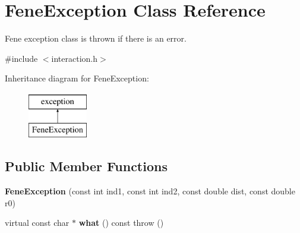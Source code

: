 \hypertarget{classFeneException}{\section{Fene\-Exception Class Reference}
\label{classFeneException}
}


Fene exception class is thrown if there is an error.  




{\ttfamily \#include $<$interaction.\-h$>$}

Inheritance diagram for Fene\-Exception\-:\begin{figure}[H]
\begin{center}
\leavevmode
\includegraphics[height=2.000000cm]{classFeneException}
\end{center}
\end{figure}
\subsection*{Public Member Functions}
\begin{DoxyCompactItemize}
\item 
\hypertarget{classFeneException_a0c49ab4b1d3554ac7520516fef599c70}{{\bfseries Fene\-Exception} (const int ind1, const int ind2, const double dist, const double r0)}\label{classFeneException_a0c49ab4b1d3554ac7520516fef599c70}

\item 
\hypertarget{classFeneException_ad9722b7db057f1b70d33e2e394e168af}{virtual const char $\ast$ {\bfseries what} () const   throw ()}\label{classFeneException_ad9722b7db057f1b70d33e2e394e168af}

\end{DoxyCompactItemize}

